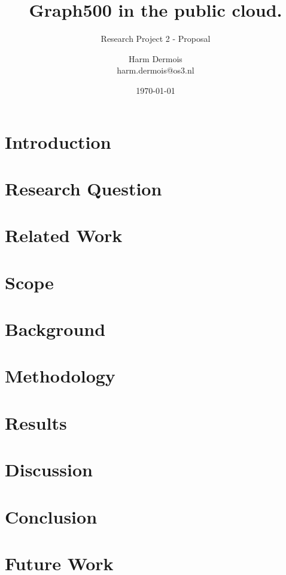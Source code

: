 \documentclass[A4]{scrartcl}
\begin{document}
\title{Graph500 in the public cloud.}
\subtitle{Research Project 2 - Proposal}
\date{\today}
\author{Harm Dermois \\ harm.dermois@os3.nl}

\maketitle
\newpage
\tableofcontents
\newpage

\section{Introduction}
\label{sec:introduction}



\section{Research Question}
\label{research-questions}



\section{Related Work}
\label{related-work}



\section{Scope}
\label{scope}


\section{Background}
\label{background}


\section{Methodology}
\label{methodology}


\section{Results}
\label{results}


\section{Discussion}
\label{discussion}


\section{Conclusion}
\label{conclusion}


\section{Future Work}
\label{future-work}


\printbibliography
\end{document}
